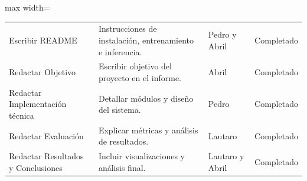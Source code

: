 \begin{table}[h]
\begin{adjustbox}{max width=\textwidth}
\begin{tabular}{p{3.3cm} p{9cm} p{1.7cm} p{1.5cm}}
Escribir README & Instrucciones de instalación, entrenamiento e inferencia. & Pedro y Abril & Completado \\
Redactar Objetivo & Escribir objetivo del proyecto en el informe. & Abril & Completado \\
Redactar Implementación técnica & Detallar módulos y diseño del sistema. & Pedro & Completado \\
Redactar Evaluación & Explicar métricas y análisis de resultados. & Lautaro & Completado \\
Redactar Resultados y Conclusiones & Incluir visualizaciones y análisis final. & Lautaro y Abril & Completado \\

\bottomrule
\end{tabular}
\end{adjustbox}
\end{table}
